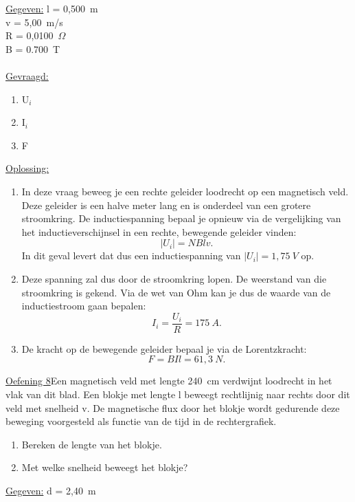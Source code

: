 \documentclass[a4paper,12pt,twoside]{article}%
\begin{document}
\underline{Gegeven:}\newline
l = 0,500~m\\
v = 5,00~m/s\\
R = 0,0100~$\Omega$\\
B = 0.700~T
\\ \\
\underline{Gevraagd:}
\begin{enumerate}
	\item U$_i$
	\item I$_i$
	\item F
\end{enumerate} 
\underline{Oplossing:}\\
\begin{enumerate}
	\item In deze vraag beweeg je een rechte geleider loodrecht op een magnetisch veld. Deze geleider is een halve meter lang en is onderdeel van een grotere stroomkring. De inductiespanning bepaal je opnieuw via de vergelijking van het inductieverschijnsel in een rechte, bewegende geleider vinden:\[\left|U_i\right|= NBlv.\]
	In dit geval levert dat dus een inductiespanning van $\left|U_i\right| = 1,75~V$ op.
	\item Deze spanning zal dus door de stroomkring lopen. De weerstand van die stroomkring is gekend. Via de wet van Ohm kan je dus de waarde van de inductiestroom gaan bepalen:
	\[I_i = \frac{U_i}{R} = 175~A.\]
	\item De kracht op de bewegende geleider bepaal je via de Lorentzkracht:\[F = BIl = 61,3~N.\]
\end{enumerate}
\newpage


\underline{Oefening 8}\newline	Een magnetisch veld met lengte 240~cm verdwijnt loodrecht in het vlak van dit blad. Een blokje met lengte l beweegt rechtlijnig naar rechts door dit veld met snelheid v. De magnetische flux door het blokje wordt gedurende deze beweging voorgesteld als functie van de tijd in de rechtergrafiek.
\begin{enumerate}
	\item Bereken de lengte van het blokje.
	\item Met welke snelheid beweegt het blokje?
\end{enumerate} 

\underline{Gegeven:}\newline
d = 2,40~m\\
\end{document}
